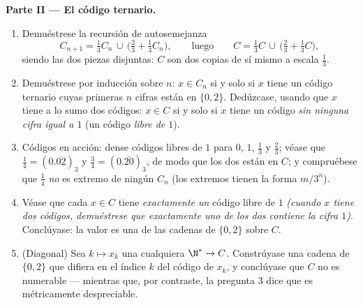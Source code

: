 \begin{problem}[{Problema del fin de semana --- el \omterm{pb:b1:topology:1}{conjunto de Cantor}
de los tercios centrales: longitud cero, no numerable, perfecto y
$C + C = \intcc{0}{2}$}]
\medskip
\noindent\textbf{Parte II --- El código ternario.}
\begin{enumerate}[resume]
  \item Demuéstrese la recursión de autosemejanza
        \[
        C_{n+1} = \tfrac13 C_n \,\cup\,
        \bigl(\tfrac23 + \tfrac13 C_n\bigr),
        \qquad\text{luego}\qquad
        C = \tfrac13 C \,\cup\, \bigl(\tfrac23 + \tfrac13
        C\bigr),
        \]
        siendo las dos piezas disjuntas: $C$ son dos copias de sí
        mismo a escala $\frac13$.
  \item Demuéstrese por inducción sobre $n$: $x \in C_n$ si y solo si
        $x$ tiene un código ternario cuyas primeras $n$ cifras están
        en $\{0, 2\}$. Dedúzcase, usando que $x$ tiene a lo sumo dos
        códigos: $x \in C$ si y solo si $x$ tiene un código
        \emph{sin ninguna cifra igual a $1$} (un código \emph{libre
        de $1$}).
  \item Códigos en acción: dense códigos libres de $1$ para $0$, $1$,
        $\frac13$ y $\frac23$; véase que
        $\frac14 = (0.\overline{02})_3$ y
        $\frac34 = (0.\overline{20})_3$, de modo que los dos están en
        $C$; y compruébese que $\frac14$ \emph{no} es extremo de
        ningún $C_n$ (los extremos tienen la forma $m/3^n$).
  \item Véase que cada $x \in C$ tiene \emph{exactamente un} código
        libre de $1$ \emph{(cuando $x$ tiene dos códigos, demuéstrese
        que exactamente uno de los dos contiene la cifra $1$)}.
        Conclúyase: la  valor es una  de las
        cadenas de $\{0,2\}$ sobre $C$.
  \item (Diagonal) Sea $k \mapsto x_k$ una  cualquiera
        $\N^* \to C$. Constrúyase una cadena de $\{0, 2\}$ que difiera
        en el índice $k$ del código de $x_k$, y conclúyase que $C$ no
        es numerable --- mientras que, por contraste, la pregunta 3
        dice que es métricamente despreciable.
\end{enumerate}


\end{problem}
